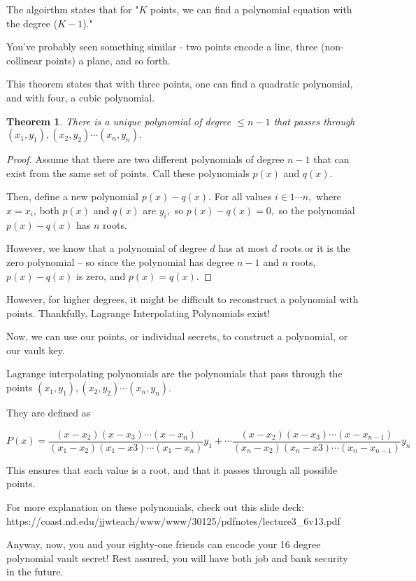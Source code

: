 \documentclass{article}
\newtheorem{theorem}{Theorem}
\theoremstyle{remark}
\theoremstyle{problem}
\numberwithin{problem}{subsection}
\numberwithin{Problem}{section}
\theoremstyle{definition}
\theoremstyle{definition}
\begin{document}
The algoirthm states that for "$K$ points, we can find a polynomial equation with the degree ($K - 1$)."

You've probably seen something similar - two points encode a line, three (non-collinear points) a plane, and so forth. 

This theorem states that with three points, one can find a quadratic polynomial, and with four, a cubic polynomial. 

\begin{theorem}
    There is a unique polynomial of degree $ \leq n-1$ that passes through $(x_1, y_1), (x_2, y_2) \cdots (x_n, y_n).$
\end{theorem}

\begin{proof}
    Assume that there are two different polynomials of degree $n-1$ that can exist from the same set of points. Call these polynomials $p(x)$ and $q(x).$

    Then, define a new polynomial $p(x) - q(x).$ For all values $i \in {1 \cdots n},$ where $x = x_i$, both $p(x)$ and $q(x)$ are $y_i,$ so $p(x) - q(x) = 0,$ so the polynomial $p(x) - q(x)$ has $n$ roots. 

    However, we know that a polynomial of degree $d$ has at most $d$ roots or it is the zero polynomial -- so since the polynomial has degree $n-1$ and $n$ roots, $p(x) - q(x)$ is zero, and $p(x) = q(x).$
\end{proof}

However, for higher degrees, it might be difficult to reconstruct a polynomial with points. Thankfully, Lagrange Interpolating Polynomials exist! 

Now, we can use our points, or individual secrets, to construct a polynomial, or our vault key. 

Lagrange interpolating polynomials are the polynomials that pass through the points $(x_1, y_1), (x_2, y_2) \cdots (x_n, y_n).$

They are defined as 

$$P(x) = \frac{(x - x_2)(x - x_3)\cdots(x-x_n)}{(x_1 - x_2)(x_1 - x3)\cdots (x_1 - x_n)} y_1 + \cdots \frac{(x - x_2)(x - x_3)\cdots(x-x_{n-1})}{(x_n - x_2)(x_n - x3)\cdots (x_n - x_{n-1})} y_n $$

This ensures that each value is a root, and that it passes through all possible points. 

For more explanation on these polynomials, check out this slide deck: https://coast.nd.edu/jjwteach/www/www/30125/pdfnotes/lecture3_6v13.pdf

Anyway, now, you and your eighty-one friends can encode your 16 degree polynomial vault secret! Rest assured, you will have both job and bank security in the future. 
\end{document}

